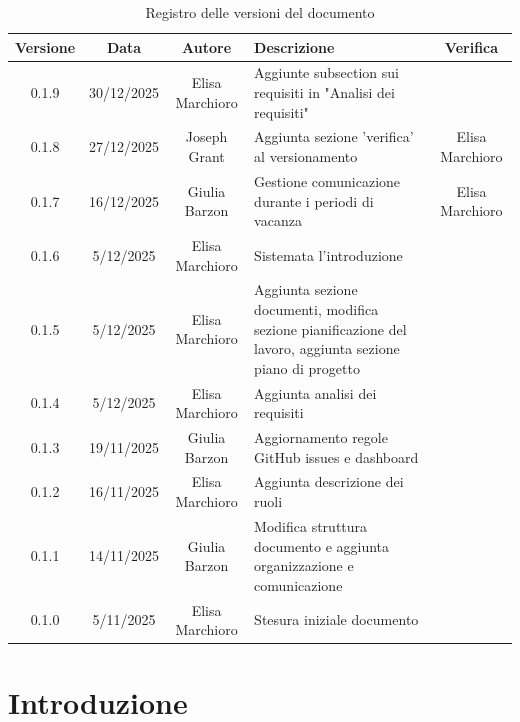 \documentclass[11pt,a4paper]{article}
\begin{document}
\begin{table}[H]
    \centering
    \begin{tabular}{|c|c|c|>{\raggedright\arraybackslash}p{}|c|}
        \hline
        \textbf{Versione} & \textbf{Data} & \textbf{Autore} & \textbf{Descrizione} & \textbf{Verifica} \\
        \hline
        0.1.9 & 30/12/2025 & Elisa Marchioro & Aggiunte subsection sui requisiti in "Analisi dei requisiti" & \\ \hline
        0.1.8 & 27/12/2025 & Joseph Grant & Aggiunta sezione 'verifica' al versionamento & Elisa Marchioro\\ \hline
        0.1.7 & 16/12/2025 & Giulia Barzon & Gestione comunicazione durante i periodi di vacanza & Elisa Marchioro\\
        \hline
        0.1.6 & 5/12/2025 & Elisa Marchioro & Sistemata l'introduzione & \\
        \hline
        0.1.5 & 5/12/2025 & Elisa Marchioro & Aggiunta sezione documenti, modifica sezione pianificazione del lavoro, aggiunta sezione piano di progetto & \\
        \hline
        0.1.4 & 5/12/2025 & Elisa Marchioro & Aggiunta analisi dei requisiti & \\
        \hline
        0.1.3 & 19/11/2025 & Giulia Barzon & Aggiornamento regole GitHub issues e dashboard & \\
        \hline
        0.1.2 & 16/11/2025 & Elisa Marchioro & Aggiunta descrizione dei ruoli & \\
        \hline
        0.1.1 & 14/11/2025 & Giulia Barzon & Modifica struttura documento e aggiunta organizzazione e comunicazione & \\
        \hline
        0.1.0 & 5/11/2025 & Elisa Marchioro & Stesura iniziale documento & \\
        \hline
    \end{tabular}
    \caption{Registro delle versioni del documento}
    \label{tab:versionamento}
\end{table}

\newpage

\tableofcontents
\newpage

\section{Introduzione}
\end{document}
